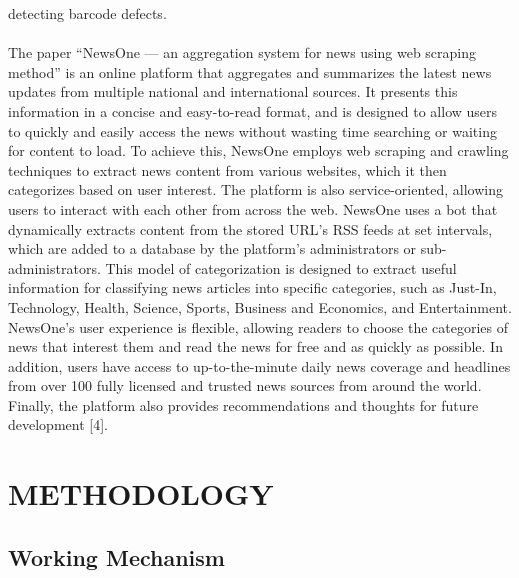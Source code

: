detecting barcode defects.
\\
\\
The paper “NewsOne — an aggregation system for news using web scraping method” 
is an online platform that aggregates and summarizes the latest news updates from 
multiple national and international sources. It presents this information in a concise and 
easy-to-read format, and is designed to allow users to quickly and easily access the 
news without wasting time searching or waiting for content to load. To achieve this, 
NewsOne employs web scraping and crawling techniques to extract news content from 
various websites, which it then categorizes based on user interest. The platform is also 
service-oriented, allowing users to interact with each other from across the web. 
NewsOne uses a bot that dynamically extracts content from the stored URL's RSS feeds 
at set intervals, which are added to a database by the platform's administrators or sub-administrators. This model of categorization is designed to extract useful information 
for classifying news articles into specific categories, such as Just-In, Technology, 
Health, Science, Sports, Business and Economics, and Entertainment. NewsOne's user 
experience is flexible, allowing readers to choose the categories of news that interest 
them and read the news for free and as quickly as possible. In addition, users have 
access to up-to-the-minute daily news coverage and headlines from over 100 fully 
licensed and trusted news sources from around the world. Finally, the platform also 
provides recommendations and thoughts for future development [4].





\chapter{METHODOLOGY}

\section{Working Mechanism}

